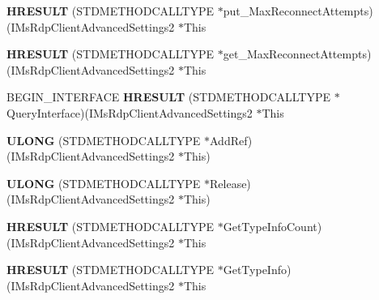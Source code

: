 \begin{DoxyCompactItemize}
{\bfseries H\+R\+E\+S\+U\+LT} (S\+T\+D\+M\+E\+T\+H\+O\+D\+C\+A\+L\+L\+T\+Y\+PE $\ast$put\+\_\+\+Max\+Reconnect\+Attempts)(I\+Ms\+Rdp\+Client\+Advanced\+Settings2 $\ast$This
\item 
\mbox{\label{struct_i_ms_rdp_client_advanced_settings2_vtbl_a480766f8a3854287c41c6fe52dc0fdfa}} 
{\bfseries H\+R\+E\+S\+U\+LT} (S\+T\+D\+M\+E\+T\+H\+O\+D\+C\+A\+L\+L\+T\+Y\+PE $\ast$get\+\_\+\+Max\+Reconnect\+Attempts)(I\+Ms\+Rdp\+Client\+Advanced\+Settings2 $\ast$This
\item 
\mbox{\label{struct_i_ms_rdp_client_advanced_settings2_vtbl_a3f70e7882278796f5a08ded403f49b91}} 
B\+E\+G\+I\+N\+\_\+\+I\+N\+T\+E\+R\+F\+A\+CE {\bfseries H\+R\+E\+S\+U\+LT} (S\+T\+D\+M\+E\+T\+H\+O\+D\+C\+A\+L\+L\+T\+Y\+PE $\ast$Query\+Interface)(I\+Ms\+Rdp\+Client\+Advanced\+Settings2 $\ast$This
\item 
\mbox{\label{struct_i_ms_rdp_client_advanced_settings2_vtbl_aa5b56476694f18869219ccd3926c1238}} 
{\bfseries U\+L\+O\+NG} (S\+T\+D\+M\+E\+T\+H\+O\+D\+C\+A\+L\+L\+T\+Y\+PE $\ast$Add\+Ref)(I\+Ms\+Rdp\+Client\+Advanced\+Settings2 $\ast$This)
\item 
\mbox{\label{struct_i_ms_rdp_client_advanced_settings2_vtbl_a90aa0479fc0d9108bb025d4a6540b791}} 
{\bfseries U\+L\+O\+NG} (S\+T\+D\+M\+E\+T\+H\+O\+D\+C\+A\+L\+L\+T\+Y\+PE $\ast$Release)(I\+Ms\+Rdp\+Client\+Advanced\+Settings2 $\ast$This)
\item 
\mbox{\label{struct_i_ms_rdp_client_advanced_settings2_vtbl_a61ce76de03d4d9412c896eb1fa9ac86f}} 
{\bfseries H\+R\+E\+S\+U\+LT} (S\+T\+D\+M\+E\+T\+H\+O\+D\+C\+A\+L\+L\+T\+Y\+PE $\ast$Get\+Type\+Info\+Count)(I\+Ms\+Rdp\+Client\+Advanced\+Settings2 $\ast$This
\item 
\mbox{\label{struct_i_ms_rdp_client_advanced_settings2_vtbl_a8048d4ffd823d77c2343a725ed3c6792}} 
{\bfseries H\+R\+E\+S\+U\+LT} (S\+T\+D\+M\+E\+T\+H\+O\+D\+C\+A\+L\+L\+T\+Y\+PE $\ast$Get\+Type\+Info)(I\+Ms\+Rdp\+Client\+Advanced\+Settings2 $\ast$This
\item 

\end{DoxyCompactItemize}
